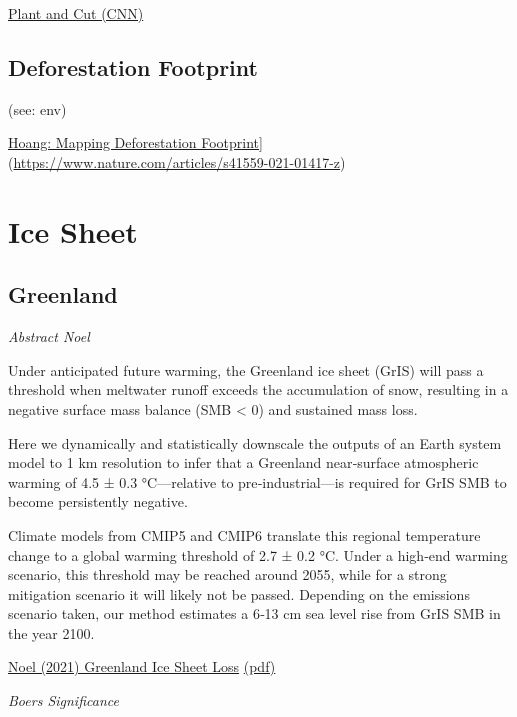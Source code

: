\documentclass[
]{book}
\begin{document}
\href{https://edition.cnn.com/2021/02/10/opinions/climate-plant-and-cut-trees-down-bader/index.html}{Plant and Cut (CNN)}

\hypertarget{deforestation-footprint}{%
\section{Deforestation Footprint}\label{deforestation-footprint}}

(see: env)

\href{Nature,\%20paywall}{Hoang: Mapping Deforestation Footprint}{]}(\url{https://www.nature.com/articles/s41559-021-01417-z})

\hypertarget{ice-sheet}{%
\chapter{Ice Sheet}\label{ice-sheet}}

\hypertarget{greenland}{%
\section{Greenland}\label{greenland}}

\emph{Abstract Noel}

Under anticipated future warming, the Greenland ice sheet (GrIS) will
pass a threshold when meltwater runoff exceeds the accumulation of snow,
resulting in a negative surface mass balance (SMB \textless{} 0) and sustained mass loss.

Here we dynamically and statistically downscale the outputs of an
Earth system model to 1 km resolution to infer that a Greenland near‐surface
atmospheric warming of 4.5 ± 0.3 °C---relative to pre‐industrial---is required
for GrIS SMB to become persistently negative.

Climate models from CMIP5 and CMIP6 translate this regional temperature change
to a global warming threshold of 2.7 ± 0.2 °C.
Under a high‐end warming scenario, this threshold may be reached around 2055,
while for a strong mitigation scenario it will likely not be passed.
Depending on the emissions scenario taken, our method estimates a 6‐13 cm sea level rise
from GrIS SMB in the year 2100.

\href{https://agupubs.onlinelibrary.wiley.com/doi/10.1029/2020GL090471}{Noel (2021) Greenland Ice Sheet Loss}
\href{pdf/Noel_2021_Greenland_Ice_Sheet_Loss.pdf}{(pdf)}

\emph{Boers Significance}
\end{document}
